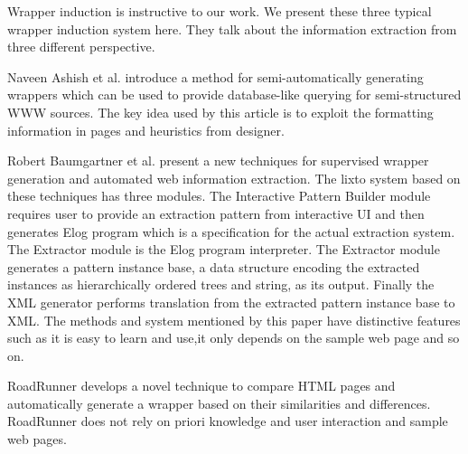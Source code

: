 Wrapper induction \cite{AshishK97:WrapperGeneration}\cite{BaumgartnerFG01:Lixto}\cite{MeccaCM01:RoadRunner} is instructive to our work. We present these three typical wrapper induction system here. They talk about the information extraction from three different perspective.

Naveen Ashish et al. \cite{AshishK97:WrapperGeneration} introduce a method for semi-automatically generating wrappers which can be used to provide database-like querying for semi-structured WWW sources. The key idea used by this article is to exploit the formatting information in pages and heuristics from designer.

Robert Baumgartner et al.\cite{BaumgartnerFG01:Lixto} present a new techniques for supervised wrapper generation and automated web information extraction.
The lixto system based on these techniques has three modules. The Interactive Pattern Builder module requires user to provide an extraction pattern from interactive UI and then generates Elog program which is a specification for the actual extraction system.
The Extractor module is the Elog program interpreter. The Extractor module generates a pattern instance base, a data structure encoding the extracted instances as hierarchically ordered trees and string, as its output. Finally the XML generator performs translation from the extracted pattern instance base to XML. The methods and system mentioned by this paper have distinctive features such as it is easy to learn and use,it only depends on the sample web page and so on.

RoadRunner \cite{MeccaCM01:RoadRunner} develops a novel technique to compare HTML pages and automatically generate a wrapper based on their similarities and differences. RoadRunner does not rely on priori knowledge and user interaction and sample web pages.

 